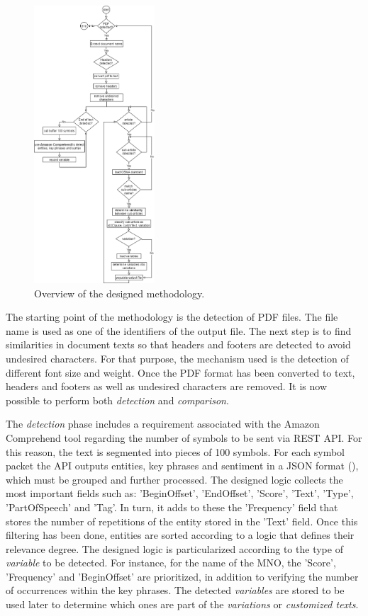 \begin{figure}[htbp]
\centerline{\includegraphics[width=0.4\textwidth]{images/methodology.png}}
\caption{Overview of the designed methodology.}
\label{fig1}
\end{figure}

The starting point of the methodology is the detection of PDF files. The file name is used as one of the identifiers of the output file. The next step is to find similarities in document texts so that headers and footers are detected to avoid undesired characters. For that purpose, the mechanism used is the detection of different font size and weight. Once the PDF format has been converted to text, headers and footers as well as undesired characters are removed. It is now possible to perform both \textit{detection} and \textit{comparison}.

The \textit{detection} phase includes a requirement associated with the Amazon Comprehend tool regarding the number of symbols to be sent via REST API. For this reason, the text is segmented into pieces of 100 symbols. For each symbol packet the API outputs entities, key phrases and sentiment in a JSON format (\cite{AWS2021}), which must be grouped and further processed. The designed logic collects the most important fields such as: 'BeginOffset', 'EndOffset', 'Score', 'Text', 'Type', 'PartOfSpeech' and 'Tag'. In turn, it adds to these the 'Frequency' field that stores the number of repetitions of the entity stored in the 'Text' field. Once this filtering has been done, entities are sorted according to a logic that defines their relevance degree. The designed logic is particularized according to the type of \textit{variable} to be detected. For instance, for the name of the MNO, the 'Score', 'Frequency' and 'BeginOffset' are prioritized, in addition to verifying the number of occurrences within the key phrases. The detected \textit{variables} are stored to be used later to determine which ones are part of the \textit{variations} or \textit{customized texts}.

